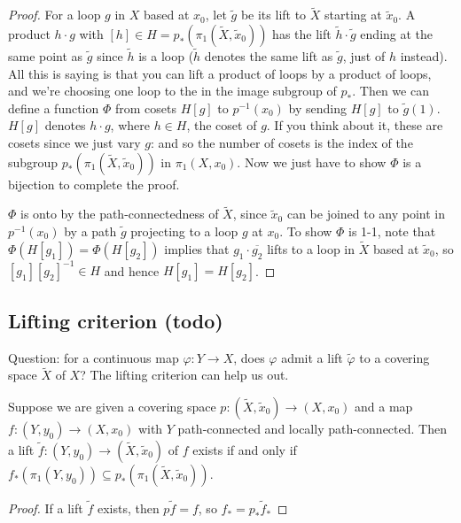 \begin{proof}
    For a loop $g$ in $X$ based at $x_0$, let $\widetilde g$ be its lift to $\widetilde X$ starting at $\widetilde x_0$. A product $h\cdot g$ with $[h]\in H=p_*(\pi_1(\widetilde X,\widetilde x_0))$ has the lift $\widetilde h \cdot \widetilde g$ ending at the same point as $\widetilde g$ since $\widetilde h$ is a loop ($\widetilde h$ denotes the same lift as $\widetilde g$, just of $h$ instead). All this is saying is that you can lift a product of loops by a product of loops, and we're choosing one loop to the in the image subgroup of $p_*$. Then we can define a function $\Phi$ from cosets $H[g]$ to $p ^{-1}(x_0)$ by sending $H[g]$ to $\widetilde g(1)$. $H[g]$ denotes $h\cdot g$, where $h\in H$, the coset of $g$. If you think about it, these are cosets since we just vary $g$: and so the number of cosets is the index of the subgroup $p_*(\pi_1(\widetilde X,\widetilde x_0))$ in $\pi_1(X,x_0)$. Now we just have to show $\Phi$ is a bijection to complete the proof.

    $\Phi$ is onto by the path-connectedness of $\widetilde X$, since $\widetilde x_0$ can be joined to any point in $p ^{-1}(x_0)$ by a path $\widetilde g$ projecting to a loop $g$ at $x_0$. To show $\Phi$ is 1-1, note that $\Phi(H[g_1])=\Phi(H[g_2])$ implies that $g_1\cdot \overline{g_2}$ lifts to a loop in $\widetilde X$ based at $\widetilde x_0$, so $[g_1][g_2]^{-1}\in H$ and hence $H[g_1]=H[g_2]$.
\end{proof}
\subsection{Lifting criterion (todo)}
Question: for a continuous map $\varphi \colon Y \to X$, does $\varphi $ admit a lift $\widetilde \varphi $ to a covering space $\widetilde X$ of $X$? The lifting criterion can help us out.
\begin{theorem}
    Suppose we are given a covering space $p \colon (\widetilde X,\widetilde x_0) \to (X,x_0)$ and a map $f \colon (Y,y_0) \to (X,x_0)$ with $Y$ path-connected and locally path-connected. Then a lift $\widetilde f \colon (Y,y_0) \to (\widetilde X,\widetilde x_0) $ of $f$ exists if and only if $f_*(\pi_1(Y,y_0))\subseteq p_*(\pi_1(\widetilde X,\widetilde x_0))$.
\end{theorem}
\begin{proof}
If a lift $\widetilde f$ exists, then $p\widetilde f=f$, so $f_*=p_* \widetilde f_*$
\end{proof}
